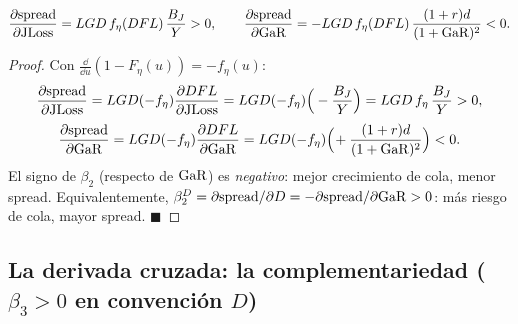 \begin{lemma}\label{lem:first-A}
\[
\frac{\partial \mathrm{spread}}{\partial \mathrm{JLoss}}=LGD\,f_\eta(DFL)\,\frac{B_J}{Y}>0,\qquad
\frac{\partial \mathrm{spread}}{\partial \mathrm{GaR}}=-LGD\,f_\eta(DFL)\,\frac{(1+r)d}{(1+\mathrm{GaR})^2}<0.
\]
\end{lemma}
\begin{proof}
Con $\frac{\dd}{\dd u}(1-F_\eta(u))=-f_\eta(u)$:
\[
\frac{\partial \mathrm{spread}}{\partial \mathrm{JLoss}}=LGD(-f_\eta)\frac{\partial DFL}{\partial\mathrm{JLoss}}=LGD(-f_\eta)\Big(-\frac{B_J}{Y}\Big)=LGD\,f_\eta\,\frac{B_J}{Y}>0,
\]
\[
\frac{\partial \mathrm{spread}}{\partial \mathrm{GaR}}=LGD(-f_\eta)\frac{\partial DFL}{\partial\mathrm{GaR}}=LGD(-f_\eta)\Big(\!+\frac{(1+r)d}{(1+\mathrm{GaR})^2}\Big)<0.
\]
El signo de $\beta_2$ (respecto de $\mathrm{GaR}$) es \emph{negativo}: mejor crecimiento de cola, menor spread. Equivalentemente, $\beta_2^{D}=\partial\mathrm{spread}/\partial D=-\partial\mathrm{spread}/\partial\mathrm{GaR}>0$: más riesgo de cola, mayor spread. $\blacksquare$
\end{proof}

\subsection{La derivada cruzada: la complementariedad \texorpdfstring{($\beta_3>0$ en convención $D$)}{(beta3>0 en convencion D)}}

